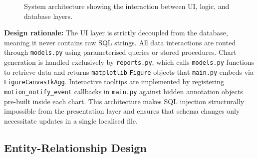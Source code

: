 \documentclass[12pt, a4paper]{article}
\begin{document}
\begin{figure}[htbp]
  \centering
  \caption{System architecture showing the interaction between UI, logic, and database layers.}
  \label{fig:system_architecture}
\end{figure}

\textbf{Design rationale:} The UI layer is strictly decoupled from the database,
meaning it never contains raw SQL strings. All data interactions are routed through
\texttt{models.py} using parameterised queries or stored procedures. Chart generation
is handled exclusively by \texttt{reports.py}, which calls \texttt{models.py} functions
to retrieve data and returns \texttt{matplotlib} \texttt{Figure} objects that
\texttt{main.py} embeds via \texttt{FigureCanvasTkAgg}. Interactive tooltips are
implemented by registering \texttt{motion\_notify\_event} callbacks in \texttt{main.py}
against hidden annotation objects pre-built inside each chart. This architecture makes
SQL injection structurally impossible from the presentation layer and ensures that
schema changes only necessitate updates in a single localised file.

\subsection{Entity-Relationship Design}
\end{document}
